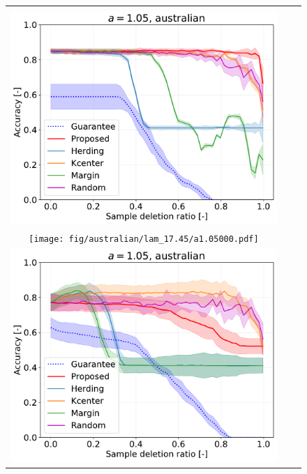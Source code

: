 \begin{figure}[H]
\begin{tabular}{ccc}
	\begin{minipage}[b]{0.3\hsize}\centering {\small Dataset: australian, $\lambda=\lambda_\mathrm{best}$}\\\includegraphics[width=0.8\hsize]{fig/australian/lam_11.0/a1.05000.pdf}\end{minipage}
	&
	\begin{minipage}[b]{0.3\hsize}\centering {\small Dataset: australian, $\lambda=n \cdot 10^{-1.5}$}\\\texttt{[image: fig/australian/lam\_17.45/a1.05000.pdf]}\end{minipage}
	&
	\begin{minipage}[b]{0.3\hsize}\centering {\small Dataset: australian, $\lambda=n$}\\\includegraphics[width=0.8\hsize]{fig/australian/lam_552/a1.05000.pdf}\end{minipage}

\end{tabular}
\end{figure}
